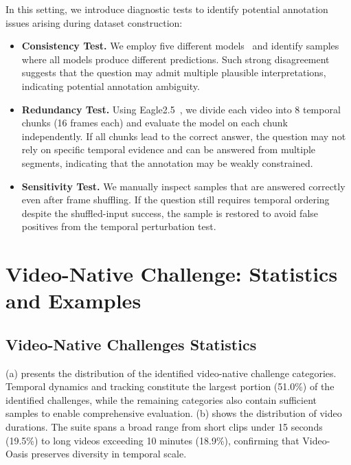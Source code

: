         In this setting, we introduce diagnostic tests to identify potential annotation issues arising during dataset construction:
        \begin{itemize}
            \item \textbf{Consistency Test.} We employ five different models~\cite{eagle25,qwem3_vl,internvl35,videoautor1,videor1} and identify samples where all models produce different predictions. 
            Such strong disagreement suggests that the question may admit multiple plausible interpretations, indicating potential annotation ambiguity.
        
            \item \textbf{Redundancy Test.} Using Eagle2.5~\cite{eagle25}, we divide each video into 8 temporal chunks (16 frames each) and evaluate the model on each chunk independently. If all chunks lead to the correct answer, the question may not rely on specific temporal evidence and can be answered from multiple segments, indicating that the annotation may be weakly constrained.

            \item \textbf{Sensitivity Test.} We manually inspect samples that are answered correctly even after frame shuffling. If the question still requires temporal ordering despite the shuffled-input success, the sample is restored to avoid false positives from the temporal perturbation test.
            
        \end{itemize}
        

\section{Video-Native Challenge: Statistics and Examples} \label{sec:d}
    
    \subsection{Video-Native Challenges Statistics} \label{sec:d.1}
    
        (a) presents the distribution of the identified video-native challenge categories. 
        Temporal dynamics and tracking constitute the largest portion (51.0\%) of the identified challenges, while the remaining categories also contain sufficient samples to enable comprehensive evaluation. 
        (b) shows the distribution of video durations. The suite spans a broad range from short clips under 15 seconds (19.5\%) to long videos exceeding 10 minutes (18.9\%), confirming that Video-Oasis preserves diversity in temporal scale.
        
